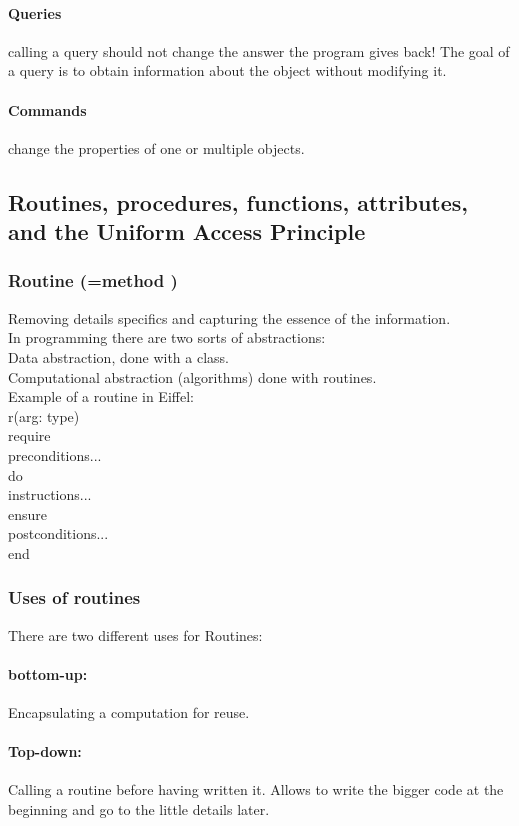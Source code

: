 \documentclass[11pt]{article}
\newcommand\tab[1][1cm]{\hspace*{#1}}
\begin{document}
	\paragraph{Queries} calling a query should not change the answer the program gives back! The goal of a query is to obtain information about the object without modifying it.
	\paragraph{Commands} change the properties of one or multiple objects.
\subsection{Routines, procedures, functions, attributes, and the Uniform Access Principle}
\subsubsection{Routine (=method )}
Removing details specifics and capturing the essence of the information.\\ In programming there are two sorts of abstractions: \\Data abstraction, done with a class.\\Computational abstraction (algorithms) done with routines.\\Example of a routine in Eiffel:\\r(arg: type)\\require\\\tab preconditions...\\do\\\tab instructions...\\ensure\\\tab  postconditions...\\end
\subsubsection{Uses of routines}There are two different uses for Routines:\paragraph{bottom-up:} Encapsulating a computation for reuse.\paragraph{Top-down:} Calling a routine before having written it. Allows to write the bigger code at the beginning and go to the little details later.
\end{document}
